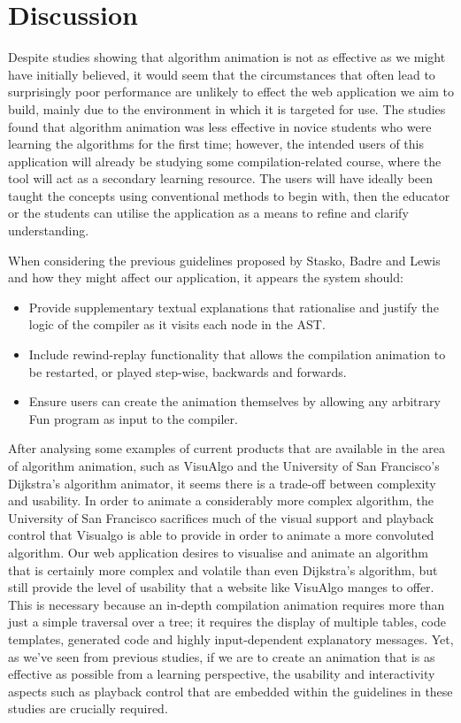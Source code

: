 \documentclass{l4proj}
\begin{document}
\section{Discussion}
Despite studies showing that algorithm animation is not as effective as we might have initially believed, it would seem that the circumstances that often lead to surprisingly poor performance are unlikely to effect the web application we aim to build, mainly due to the environment in which it is targeted for use. The studies found that algorithm animation was less effective in novice students who were learning the algorithms for the first time; however, the intended users of this application will already be studying some compilation-related course, where the tool will act as a secondary learning resource. The users will have ideally been taught the concepts using conventional methods to begin with, then the educator or the students can utilise the application as a means to refine and clarify understanding.

When considering the previous guidelines proposed by Stasko, Badre and Lewis and how they might affect our application, it appears the system should:
\begin{itemize}
\item Provide supplementary textual explanations that rationalise and justify the logic of the compiler as it visits each node in the AST.
\item Include rewind-replay functionality that allows the compilation animation to be restarted, or played step-wise, backwards and forwards.
\item Ensure users can create the animation themselves by allowing any arbitrary Fun program as input to the compiler.
\end{itemize}

After analysing some examples of current products that are available in the area of algorithm animation, such as VisuAlgo and the University of San Francisco's Dijkstra's algorithm animator, it seems there is a trade-off between complexity and usability. In order to animate a considerably more complex algorithm, the University of San Francisco sacrifices much of the visual support and playback control that Visualgo is able to provide in order to animate a more convoluted algorithm. Our web application desires to visualise and animate an algorithm that is certainly more complex and volatile than even Dijkstra's algorithm, but still provide the level of usability that a website like VisuAlgo manges to offer. This is necessary because an in-depth compilation animation requires more than just a simple traversal over a tree; it requires the display of multiple tables, code templates, generated code and highly input-dependent explanatory messages. Yet, as we've seen from previous studies, if we are to create an animation that is as effective as possible from a learning perspective, the usability and interactivity aspects such as playback control that are embedded within the guidelines in these studies are crucially required.
\end{document}
